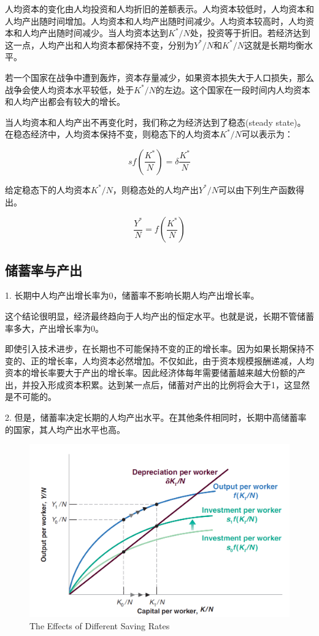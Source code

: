 \documentclass{article}
\begin{document}
人均资本的变化由人均投资和人均折旧的差额表示。人均资本较低时，人均资本和人均产出随时间增加。人均资本和人均产出随时间减少。人均资本较高时，人均资本和人均产出随时间减少。当人均资本达到$ K^*/N $处，投资等于折旧。若经济达到这一点，人均产出和人均资本都保持不变，分别为$ Y^*/N $和$ K^*/N $这就是长期均衡水平。

若一个国家在战争中遭到轰炸，资本存量减少，如果资本损失大于人口损失，那么战争会使人均资本水平较低，处于$ K^*/N $的左边。这个国家在一段时间内人均资本和人均产出都会有较大的增长。

当人均资本和人均产出不再变化时，我们称之为经济达到了稳态(steady state)。在稳态经济中，人均资本保持不变，则稳态下的人均资本$ K^*/N $可以表示为：

\[
sf(\frac{K^*}{N})=\delta\frac{K^*}{N}
\]

给定稳态下的人均资本$ K^*/N $，则稳态处的人均产出$ Y^*/N $可以由下列生产函数得出。

\[
\frac{Y^*}{N}=f(\frac{K^*}{N})
\]

\subsection{储蓄率与产出}

1. 长期中人均产出增长率为0，储蓄率不影响长期人均产出增长率。

这个结论很明显，经济最终趋向于人均产出的恒定水平。也就是说，长期不管储蓄率多大，产出增长率为0。

即使引入技术进步，在长期也不可能保持不变的正的增长率。因为如果长期保持不变的、正的增长率，人均资本必然增加。不仅如此，由于资本规模报酬递减，人均资本的增长率要大于产出的增长率。因此经济体每年需要储蓄越来越大份额的产出，并投入形成资本积累。达到某一点后，储蓄对产出的比例将会大于1，这显然是不可能的。

\hspace*{\fill}

2. 但是，储蓄率决定长期的人均产出水平。在其他条件相同时，长期中高储蓄率的国家，其人均产出水平也高。

\begin{figure}[H] %
	\centering %
	\includegraphics[width=1\textwidth]{11_3} %
	\caption{The Effects of Different
		Saving Rates} %
	\label{Fig.main4} %
\end{figure}
\end{document}
